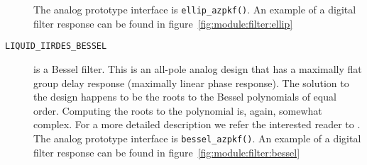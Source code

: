 \begin{description}
    The analog prototype interface is {\tt ellip\_azpkf()}.
    An example of a digital filter response can be found in
    figure~\ref{fig:module:filter:ellip}
\item[{\tt LIQUID\_IIRDES\_BESSEL}]
    is a Bessel filter.
    This is an all-pole analog design that has a maximally flat group delay
    response (maximally linear phase response).
    The solution to the design happens to be the roots to the Bessel
    polynomials of equal order.
    Computing the roots to the polynomial is, again, somewhat complex.
    For a more detailed description we refer the interested reader to
    \cite{Orchard:1965}.
    The analog prototype interface is {\tt bessel\_azpkf()}.
    An example of a digital filter response can be found in
    figure~\ref{fig:module:filter:bessel}
\end{description}

% 
%
